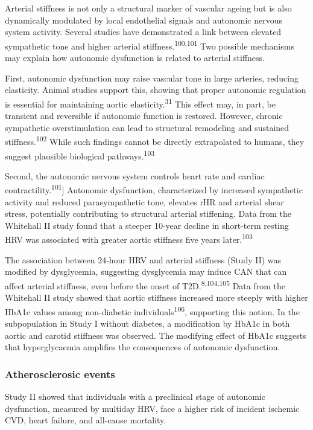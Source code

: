 \documentclass[
  letterpaper,
  headsepline=true,
  open=any]{scrbook}
\begin{document}
Arterial stiffness is not only a structural marker of vascular ageing
but is also dynamically modulated by local endothelial signals and
autonomic nervous system activity. Several studies have demonstrated a
link between elevated sympathetic tone and higher arterial
stiffness.\textsuperscript{100,101} Two possible mechanisms may explain
how autonomic dysfunction is related to arterial stiffness.

First, autonomic dysfunction may raise vascular tone in large arteries,
reducing elasticity. Animal studies support this, showing that proper
autonomic regulation is essential for maintaining aortic
elasticity.\textsuperscript{31} This effect may, in part, be transient
and reversible if autonomic function is restored. However, chronic
sympathetic overstimulation can lead to structural remodeling and
sustained stiffness.\textsuperscript{102} While such findings cannot be
directly extrapolated to humans, they suggest plausible biological
pathways.\textsuperscript{103}

Second, the autonomic nervous system controls heart rate and cardiac
contractility.\textsuperscript{101}{]} Autonomic dysfunction,
characterized by increased sympathetic activity and reduced
parasympathetic tone, elevates rHR and arterial shear stress,
potentially contributing to structural arterial stiffening. Data from
the Whitehall II study found that a steeper 10-year decline in
short-term resting HRV was associated with greater aortic stiffness five
years later.\textsuperscript{103}

The association between 24-hour HRV and arterial stiffness (Study II)
was modified by dysglycemia, suggesting dysglycemia may induce CAN that
can affect arterial stiffness, even before the onset of
T2D.\textsuperscript{8,104,105} Data from the Whitehall II study showed
that aortic stiffness increased more steeply with higher HbA1c values
among non-diabetic individuals\textsuperscript{106}, supporting this
notion. In the subpopulation in Study I without diabetes, a modification
by HbA1c in both aortic and carotid stiffness was observed. The
modifying effect of HbA1c suggests that hyperglycaemia amplifies the
consequences of autonomic dysfunction.

\hypertarget{atherosclerosic-events}{%
\subsubsection{Atherosclerosic events}\label{atherosclerosic-events}}

Study II showed that individuals with a preclinical stage of autonomic
dysfunction, measured by multiday HRV, face a higher risk of incident
ischemic CVD, heart failure, and all-cause mortality.
\end{document}
